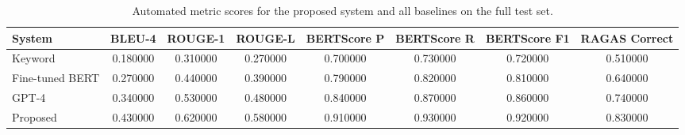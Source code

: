 \begin{table}
\caption{Automated metric scores for the proposed system and all baselines on the full test set.}
\label{tab:tab08_automated_metrics}
\begin{tabular}{lccccccc}
\toprule
System & BLEU-4 & ROUGE-1 & ROUGE-L & BERTScore P & BERTScore R & BERTScore F1 & RAGAS Correct \\
\midrule
Keyword & 0.180000 & 0.310000 & 0.270000 & 0.700000 & 0.730000 & 0.720000 & 0.510000 \\
Fine-tuned BERT & 0.270000 & 0.440000 & 0.390000 & 0.790000 & 0.820000 & 0.810000 & 0.640000 \\
GPT-4 & 0.340000 & 0.530000 & 0.480000 & 0.840000 & 0.870000 & 0.860000 & 0.740000 \\
Proposed & 0.430000 & 0.620000 & 0.580000 & 0.910000 & 0.930000 & 0.920000 & 0.830000 \\
\bottomrule
\end{tabular}
\end{table}
